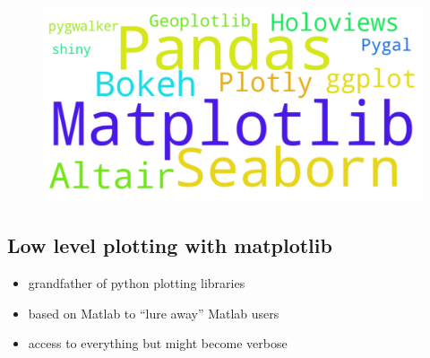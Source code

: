 \documentclass[
  letterpaper,
  DIV=11,
  numbers=noendperiod]{scrartcl}
\providecommand{\tightlist}{%
  \setlength{\itemsep}{0pt}\setlength{\parskip}{0pt}}\usepackage{longtable,booktabs,array}
\begin{document}
\begin{figure}[H]

{\centering \includegraphics{plotting_libs_eda_files/figure-pdf/cell-2-output-1.pdf}

}

\end{figure}

\hypertarget{low-level-plotting-with-matplotlib}{%
\subsection{Low level plotting with
matplotlib}\label{low-level-plotting-with-matplotlib}}

\begin{itemize}
\tightlist
\item
  grandfather of python plotting libraries
\item
  based on Matlab to ``lure away'' Matlab users
\item
  access to everything but might become verbose
\end{itemize}
\end{document}
